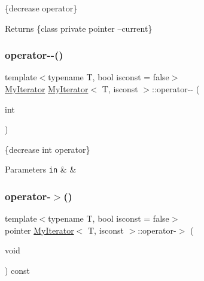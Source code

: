 \{decrease operator\} 

\begin{DoxyReturn}{Returns}
\{class private pointer --current\} 
\end{DoxyReturn}
\mbox{\label{classMyIterator_ac976eedaee9a65a69133d7bd3306efab}} 
\subsubsection{\texorpdfstring{operator-\/-\/()}{operator--()}\hspace{0.1cm}{\footnotesize\ttfamily [2/2]}}
{\footnotesize\ttfamily template$<$typename T, bool isconst = false$>$ \\
\hyperlink{classMyIterator}{My\+Iterator} \hyperlink{classMyIterator}{My\+Iterator}$<$ T, isconst $>$\+::operator-\/-\/ (\begin{DoxyParamCaption}\item[{int}]{ }\end{DoxyParamCaption})\hspace{0.3cm}{\ttfamily [inline]}}



\{decrease int operator\} 


\begin{DoxyParams}[1]{Parameters}
\mbox{\tt in}  & {\em } & \\
\hline
\end{DoxyParams}
\mbox{\label{classMyIterator_a2ff4f43ca484f81a899f6b33afe69139}} 
\subsubsection{\texorpdfstring{operator-\/$>$()}{operator->()}}
{\footnotesize\ttfamily template$<$typename T, bool isconst = false$>$ \\
pointer \hyperlink{classMyIterator}{My\+Iterator}$<$ T, isconst $>$\+::operator-\/$>$ (\begin{DoxyParamCaption}\item[{void}]{ }\end{DoxyParamCaption}) const\hspace{0.3cm}{\ttfamily [inline]}}




